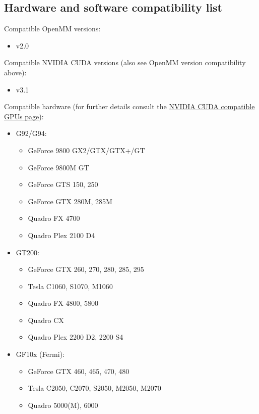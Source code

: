 \subsection{Hardware and software compatibility list}\label{subsec:compatibility}

Compatible OpenMM versions:
\begin{itemize}
\item v2.0
\end{itemize}

Compatible NVIDIA CUDA versions (also see OpenMM version compatibility above): 
\begin{itemize}
\item v3.1
\end{itemize}

Compatible hardware (for further details consult the 
\href{http://www.nvidia.com/object/cuda\_gpus.html}{NVIDIA CUDA compatible GPUs page}):
\begin{itemize}
\item G92/G94:
    \begin{itemize}
    \item GeForce 9800 GX2/GTX/GTX+/GT
    \item GeForce 9800M GT
    \item GeForce GTS 150, 250
    \item GeForce GTX 280M, 285M
    \item Quadro FX 4700
    \item Quadro Plex 2100 D4
    \end{itemize}
\item GT200:
    \begin{itemize}
    \item GeForce GTX 260, 270, 280, 285, 295 
    \item Tesla C1060, S1070, M1060
    \item Quadro FX 4800, 5800
    \item Quadro CX
    \item Quadro Plex 2200 D2, 2200 S4
    \end{itemize}
\item GF10x (Fermi):
    \begin{itemize}
    \item GeForce GTX 460, 465, 470, 480       
    \item Tesla C2050, C2070, S2050, M2050, M2070
    \item Quadro 5000(M), 6000
    \end{itemize}
\end{itemize}

